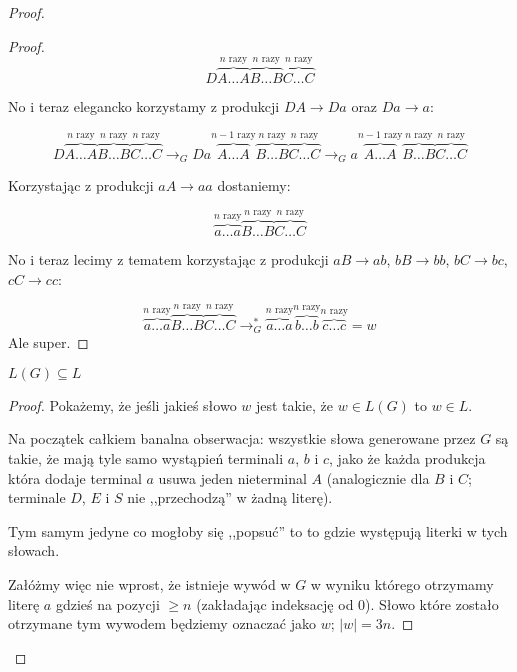 \begin{proof}
\begin{proof}
		\[
			D \overbrace{A \dots A}^{\text{\(n\) razy}} \overbrace{B \dots B}^{\text{\(n\) razy}}
			\overbrace{C \dots C}^{\text{\(n\) razy}}
		\]

		No i teraz elegancko korzystamy z produkcji \( DA \rightarrow Da \) oraz \(Da \rightarrow a\):

		\[
			D \overbrace{A \dots A}^{\text{\(n\) razy}} \overbrace{B \dots B}^{\text{\(n\) razy}}
			\overbrace{C \dots C}^{\text{\(n\) razy}} \rightarrow_G Da\overbrace{A \dots A}^{\text{\(n-1\) razy}} \overbrace{B \dots B}^{\text{\(n\) razy}}
			\overbrace{C \dots C}^{\text{\(n\) razy}}
			\rightarrow_G a\overbrace{A \dots A}^{\text{\(n-1\) razy}} \overbrace{B \dots B}^{\text{\(n\) razy}}
			\overbrace{C \dots C}^{\text{\(n\) razy}}
		\]

		Korzystając z produkcji \(aA \rightarrow aa\) dostaniemy:

		\[
			\overbrace{a \dots a}^{\text{\(n\) razy}} \overbrace{B \dots B}^{\text{\(n\) razy}}
			\overbrace{C \dots C}^{\text{\(n\) razy}}
		\]

		No i teraz lecimy z tematem korzystając z produkcji \(aB \rightarrow ab \), \(bB \rightarrow bb\), \(bC \rightarrow bc\), \( cC \rightarrow cc\):

		\[
			\overbrace{a \dots a}^{\text{\(n\) razy}} \overbrace{B \dots B}^{\text{\(n\) razy}}
			\overbrace{C \dots C}^{\text{\(n\) razy}}
			\rightarrow_G^{*}
			\overbrace{a \dots a}^{\text{\(n\) razy}} \overbrace{b \dots b}^{\text{\(n\) razy}}
			\overbrace{c \dots c}^{\text{\(n\) razy}}
			= w
		\]
		Ale super.
	\end{proof}

	\begin{lemma}
		\(L(G) \subseteq L\)
	\end{lemma}
	\begin{proof}
		Pokażemy, że jeśli jakieś słowo \(w\) jest takie, że \(w \in L(G)\) to \(w \in L\).

		Na początek całkiem banalna obserwacja: wszystkie słowa generowane przez \(G\) są takie, że mają tyle samo wystąpień terminali \(a\), \(b\) i \(c\), jako że każda produkcja która dodaje terminal \(a\) usuwa jeden nieterminal \(A\) (analogicznie dla \(B\) i \(C\); terminale \(D\), \(E\) i \(S\) nie ,,przechodzą'' w żadną literę).

		Tym samym jedyne co mogłoby się ,,popsuć'' to to gdzie występują literki w tych słowach.

		Załóżmy więc nie wprost, że istnieje wywód w \(G\) w wyniku którego otrzymamy literę \(a\) gdzieś na pozycji \( \geq n\) (zakładając indeksację od 0). Słowo które zostało otrzymane tym wywodem będziemy oznaczać jako \(w\); \( |w| = 3n\).


\end{proof}
\end{proof}
